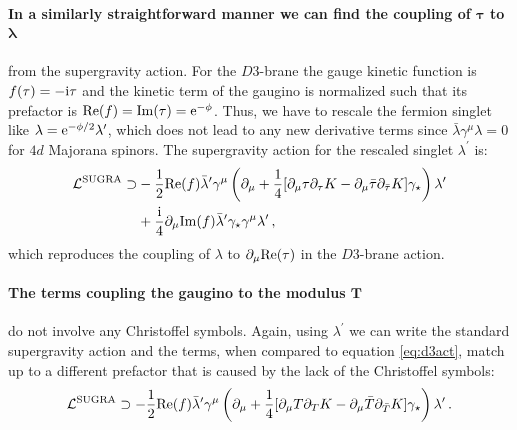 \documentclass[a4paper,12pt]{report}
\newcommand{\be}{\begin{equation}}
\newcommand{\ee}{\end{equation}}
\newcommand{\bea}{\begin{equation}\begin{aligned}}
\newcommand{\eea}{\end{aligned}\end{equation}}
\def\rmi{{\rm i}}
\def\rme{{\rm e}}
\def\rmre{{\rm Re}}
\def\rmim{{\rm Im}}
\begin{document}
\paragraph{In a similarly straightforward manner we can find the coupling of $\mathbf{\tau}$ to $\mathbf{\lambda}$} from the supergravity action. For the $D3$-brane the gauge kinetic function is $f(\tau) = -\rmi \tau$ and the kinetic term of the gaugino is normalized such that its prefactor is $\rmre(f) = \rmim(\tau) = \rme^{-\phi}$. Thus, we have to rescale the fermion singlet like $\lambda = \rme^{-\phi/2} \lambda^\prime$, which does not lead to any new derivative terms since $\bar{\lambda} \gamma^\mu \lambda =0$ for $4d$ Majorana spinors. The supergravity action for the rescaled singlet $\lambda^\prime$ is:
\bea 
\mathcal{L}^{\text{SUGRA}} \supset &-\frac{1}{2} \rmre(f) \bar{\lambda}^\prime \gamma^\mu \left( \partial_\mu + \frac{1}{4} [\partial_\mu \tau \partial_\tau K - \partial_\mu \bar{\tau} \partial_{\bar{\tau}} K ] \gamma_\star \right) \lambda^\prime\\
&+ \frac{\rmi}{4} \partial_\mu \rmim(f)\bar{\lambda}^\prime \gamma_\star \gamma^\mu \lambda^\prime\,,
\eea
which reproduces the coupling of $\lambda$ to $\partial_\mu \rmre(\tau)$ in the $D3$-brane action.
\paragraph{The terms coupling the gaugino to the modulus $\mathbf{T}$} do not involve any Christoffel symbols. Again, using $\lambda^\prime$ we can write the standard supergravity action and the terms, when compared to equation \eqref{eq:d3act}, match up to a different prefactor that is caused by the lack of the Christoffel symbols:
\be
\mathcal{L}^{\text{SUGRA}} \supset - \frac{1}{2} \rmre(f) \bar{\lambda}^\prime \gamma^\mu \left( \partial_\mu + \frac{1}{4} [\partial_\mu T \partial_T K - \partial_\mu \bar{T} \partial_{\bar{T}} K]\gamma_\star\right) \lambda^\prime\,.
\ee
\end{document}
